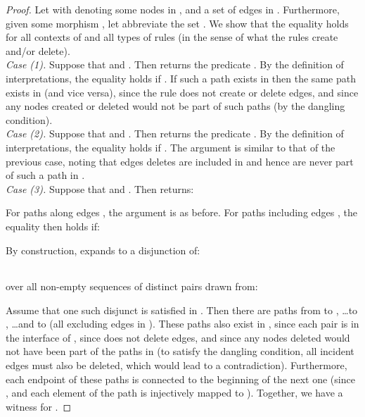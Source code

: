 \documentclass{llncs}
\begin{document}
	\begin{proof}
		Let  with  denoting some nodes in , and  a set of edges in . Furthermore, given some morphism , let  abbreviate the set . We show that the equality holds for all contexts of  and all types of rules  (in the sense of what the rules create and/or delete).\\
		
		\noindent\emph{Case (1).} Suppose that  and . Then  returns the predicate . By the definition of interpretations, the equality holds if . If such a path exists in  then the same path exists in  (and vice versa), since the rule does not create or delete edges, and since any nodes created or deleted would not be part of such paths (by the dangling condition).\\
		
		\noindent\emph{Case (2).} Suppose that  and . Then  returns the predicate . By the definition of interpretations, the equality holds if . The argument is similar to that of the previous case, noting that edges  deletes are included in  and hence are never part of such a path in .\\
		
		\noindent\emph{Case (3).} Suppose that  and . Then  returns:
		
		
		\noindent For paths along edges , the argument is as before. For paths including edges , the equality then holds if:
		
		
		\noindent By construction,  expands to a disjunction of:
		\begin{center}
			\begin{tabular}{c}
				\\
				
			\end{tabular}
		\end{center}

		\noindent over all non-empty sequences of distinct pairs  drawn from:
		
		
		\noindent Assume that one such disjunct is satisfied in . Then there are paths from  to , \dots  to , \dots and  to  (all excluding edges in ). These paths also exist in , since each  pair is in the interface of , since  does not delete edges, and since any nodes deleted would not have been part of the paths in  (to satisfy the dangling condition, all incident edges must also be deleted, which would lead to a contradiction). Furthermore, each endpoint  of these paths is connected to the beginning of the next one  (since , and each element of the path is injectively mapped to ). Together, we have a witness for .
		

\end{proof}
\end{document}
